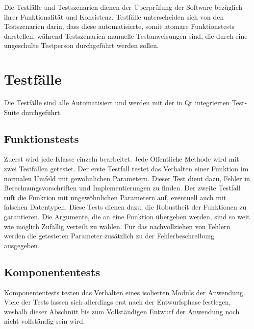 Die Testfälle und Testszenarien dienen der Überprüfung der Software bezüglich ihrer Funktionalität und Konsistenz. Testfälle unterscheiden sich von den Testszenarien darin, dass diese automatisierte, somit atomare Funktionstests darstellen, während Testszenarien manuelle Testanweisungen sind, die durch eine ungeschulte Testperson durchgeführt werden sollen.

\section{Testfälle}
Die Testfälle sind alle Automatisiert und werden mit der in Qt integrierten Test-Suite durchgeführt.
\subsection{Funktionstests}
Zuerst wird jede Klasse einzeln bearbeitet. Jede Öffentliche Methode wird mit zwei Testfällen getestet. Der erste Testfall testet das Verhalten einer Funktion im normalen Umfeld mit gewöhnlichen Parametern. Dieser Test dient dazu, Fehler in Berechnungsvorschriften und Implementierungen zu finden. Der zweite Testfall ruft die Funktion mit ungewöhnlichen Parametern auf, eventuell auch mit falschen Datentypen. Diese Tests dienen dazu, die Robustheit der Funktionen zu garantieren. Die Argumente, die an eine Funktion übergeben werden, sind so weit wie möglich Zufällig verteilt zu wählen. Für das nachvollziehen von Fehlern werden die getesteten Parameter zusätzlich zu der Fehlerbeschreibung ausgegeben.
\subsection{Komponententests}
Komponententests testen das Verhalten eines isolierten Moduls der Anwendung. Viele der Tests lassen sich allerdings erst nach der Entwurfsphase festlegen, weshalb dieser Abschnitt bis zum Vollständigen Entwurf der Anwendung noch nicht vollständig sein wird.

